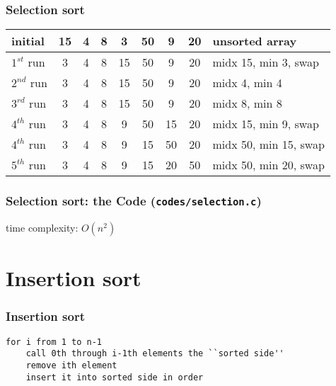 \documentclass[newPxFont,sthlmFooter,nooffset]{beamer}
\begin{document}
\begin{frame}[t, fragile]
  \frametitle{Selection sort}
  \begin{tabular}{p{1.5cm}| c | c | c | c | c | c | c |p{4cm}}
initial & 15 & 4  & 8  & 3  & 50 & 9 & 20 & unsorted array \\ \hline
$1^{st}$ run & \color{red}3  & 4 & 8  & \color{red}15  & 50 & 9 & 20 & midx 15, min 3, swap \pause\\ [0.8em] \hline
$2^{nd}$ run & \color{blue}3  & \color{red}4 & 8  & 15  & 50 & 9 & 20 & midx 4, min 4 \pause\\  [0.8em] \hline
$3^{rd}$ run & \color{blue}3  & \color{blue}4 & \color{red}8  & 15  & 50 & 9 & 20 & midx 8, min 8 \pause\\  [0.8em] \hline
$4^{th}$ run & \color{blue}3  & \color{blue}4 &\color{blue} 8  & \color{red}9  & 50 & \color{red}15 & 20 & midx 15, min 9, swap \pause\\  [0.8em] \hline
$4^{th}$ run & \color{blue}3  & \color{blue}4 &\color{blue} 8  & \color{blue}9  & \color{red}15 & \color{red}50 & 20 & midx 50, min 15, swap \pause\\  [0.8em] \hline
$5^{th}$ run & \color{blue}3  & \color{blue}4 &\color{blue} 8  & \color{blue}9  & \color{blue}15 & \color{red}20 & \color{red}50 & midx 50, min 20, swap \\  [0.8em]
  \end{tabular}

\end{frame}


\begin{frame}[t, fragile]
  \frametitle{Selection sort: the Code (\texttt{codes/selection.c})}
  

time complexity: $O(n^2)$
\end{frame}


\section{Insertion sort}

\begin{frame}[t, fragile]
  \frametitle{Insertion sort}
  \begin{lstlisting}
for i from 1 to n-1
    call 0th through i-1th elements the ``sorted side''
    remove ith element
    insert it into sorted side in order
  \end{lstlisting}  
\end{frame}
\end{document}

